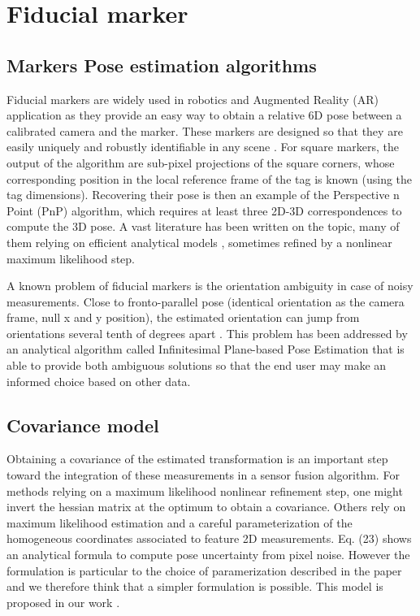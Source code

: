 %
%
\section{Fiducial marker}
\subsection{Markers Pose estimation algorithms}

Fiducial markers are widely used in robotics and Augmented Reality (AR) application as they provide an easy way to obtain a relative 6D pose 
between a calibrated camera and the marker. These markers are designed so that they are easily uniquely and robustly identifiable in any scene 
\cite{wang2016iros,romero2018speeded}. For square markers, the output of the algorithm are sub-pixel projections of the square corners, whose 
corresponding position in the local reference frame of the tag is known (using the tag dimensions). Recovering their pose is then an example 
of the Perspective n Point (PnP) algorithm, which requires at least three 2D-3D correspondences to compute the 3D pose. 
A vast literature has been written on the topic, many of them relying on efficient analytical models
\cite{gao2003complete, lepetit2009epnp, collins2014infinitesimal, terzakis2020consistently}, sometimes refined by a nonlinear maximum likelihood step. 

A known problem of fiducial markers is the orientation ambiguity in case of noisy measurements. Close to fronto-parallel pose (identical orientation as 
the camera frame, null x and y position), the estimated orientation can jump from orientations several tenth of degrees apart \cite{collins2014infinitesimal}. 
This problem has been addressed by an analytical algorithm called Infinitesimal Plane-based Pose Estimation \cite{collins2014infinitesimal} that is able to 
provide both ambiguous solutions so that the end user may make an informed choice based on other data.

\subsection{Covariance model}
Obtaining a covariance of the estimated transformation is an important step toward the integration of these measurements in a sensor fusion algorithm.
For methods relying on a maximum likelihood nonlinear refinement step, one might invert the hessian matrix at the optimum to obtain a covariance.
Others \cite{urban2016mlpnp} rely on maximum likelihood estimation and a careful parameterization of the homogeneous coordinates associated to feature
2D measurements. Eq. (23) \cite{urban2016mlpnp} shows an analytical formula to compute pose uncertainty from pixel noise. However the formulation is 
particular to the choice of paramerization described in the paper and we therefore think that a simpler formulation is possible. This model is proposed 
in our work \cite{fourmy2019absolute}. 

